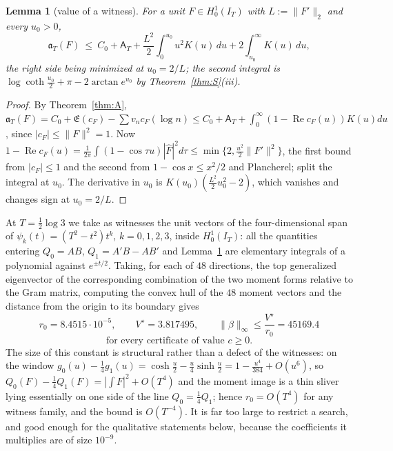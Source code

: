 \documentclass[11pt]{amsart}
\newtheorem{lemma}[theorem]{Lemma}
\theoremstyle{definition}
\theoremstyle{remark}
\newcommand{\Rel}{\operatorname{Re}}
\newcommand{\IT}{I_T}
\newcommand{\Fh}{\widehat F}
\newcommand{\cF}{c_F}
\newcommand{\Lev}{\mathfrak E}
\newcommand{\Aconst}{\mathsf A_T}
\begin{document}
\begin{lemma}[value of a witness]\label{lem:val}
For a unit $F\in H^1_0(\IT)$ with $L:=\|F'\|_2$ and every $u_0>0$,
\[
\mathfrak a_T(F)\ \le\ C_0+\Aconst+\frac{L^2}2\int_0^{u_0}u^2K(u)\,du+2\int_{u_0}^\infty K(u)\,du,
\]
the right side being minimized at $u_0=2/L$; the second integral is
$\log\coth\frac{u_0}2+\pi-2\arctan e^{u_0}$ by Theorem~\ref{thm:S}(iii).
\end{lemma}
\begin{proof}
By Theorem~\ref{thm:A}, $\mathfrak a_T(F)=C_0+\Lev(\cF)-\sum v_n\cF(\log n)\le C_0+\Aconst+
\int_0^\infty(1-\Rel\cF(u))K(u)du$, since $|\cF|\le\|F\|^2=1$. Now
$1-\Rel\cF(u)=\frac1{2\pi}\int(1-\cos\tau u)|\Fh|^2d\tau\le\min\{2,\frac{u^2}2\|F'\|^2\}$, the first
bound from $|\cF|\le1$ and the second from $1-\cos x\le x^2/2$ and Plancherel; split the integral at
$u_0$. The derivative in $u_0$ is $K(u_0)(\frac{L^2}2u_0^2-2)$, which vanishes and changes sign at
$u_0=2/L$.
\end{proof}

At $T=\frac12\log3$ we take as witnesses the unit vectors of the four-dimensional span of
$\psi_k(t)=(T^2-t^2)t^k$, $k=0,1,2,3$, inside $H^1_0(\IT)$: all the quantities entering
$Q_0=AB$, $Q_1=A'B-AB'$ and Lemma~\ref{lem:val} are elementary integrals of a polynomial against
$e^{\pm t/2}$. Taking, for each of $48$ directions, the top generalized eigenvector of the
corresponding combination of the two moment forms relative to the Gram matrix, computing the convex
hull of the $48$ moment vectors and the distance from the origin to its boundary gives
\[
r_0=8.4515\cdot10^{-5},\qquad V^\star=3.817495,\qquad
\|\beta\|_\infty\le\frac{V^\star}{r_0}=45169.4
\]
\[
\text{for every certificate of value }c\ge0 .
\]
The size of this constant is structural rather than a defect of the witnesses: on the window
$g_0(u)-\frac14g_1(u)=\cosh\frac u2-\frac u4\sinh\frac u2=1-\frac{u^4}{384}+O(u^6)$, so
$Q_0(F)-\frac14Q_1(F)=|\int F|^2+O(T^4)$ and the moment image is a thin sliver lying essentially on
one side of the line $Q_0=\frac14Q_1$; hence $r_0=O(T^4)$ for any witness family, and the bound is
$O(T^{-4})$. It is far too large to restrict a search, and good enough for the qualitative
statements below, because the coefficients it multiplies are of size $10^{-9}$.
\end{document}
